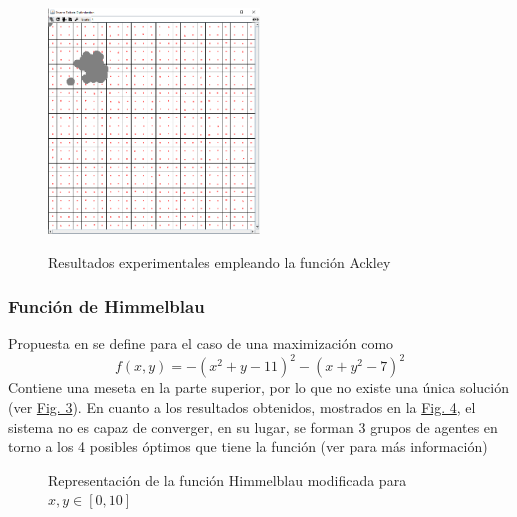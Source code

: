 \documentclass[runningheads]{llncs}
\begin{document}
    \begin{figure}[htbp]
		\centering
		\includegraphics[width=0.5\textwidth]{Resultado_ackley}
		\label{fig:3}
		\caption{Resultados experimentales empleando la función Ackley}
	\end{figure}

    \subsubsection{Función de Himmelblau} Propuesta en \cite{HimmelblauFunction} se define para el caso de una maximización como
    \[  f(x,y)=-(x^2 + y - 11)^2 - (x + y^2 - 7)^2  \] 
    Contiene una meseta en la parte superior, por lo que no existe una única solución (ver \hyperref[fig:4]{Fig. 3}).
    En cuanto a los resultados obtenidos, mostrados en la \hyperref[fig:5]{Fig. 4}, el sistema no es capaz de converger, en su lugar, se forman 3 grupos de agentes en torno a los 4 posibles óptimos que tiene la función (ver \cite{WebFuncionesOptimizacion} para más información)


    \begin{figure}[htbp]
		\centering
		\label{fig:4}
		\caption{Representación de la función Himmelblau modificada para $x,y\in[0,10]$}
	\end{figure}
\end{document}
